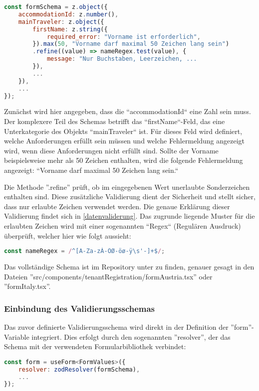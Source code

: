 \begin{lstlisting}[language=JavaScript]
const formSchema = z.object({
    accommodationId: z.number(),
    mainTraveler: z.object({
        firstName: z.string({
            required_error: "Vorname ist erforderlich",
        }).max(50, "Vorname darf maximal 50 Zeichen lang sein")
        .refine((value) => nameRegex.test(value), {
            message: "Nur Buchstaben, Leerzeichen, ...
        }),
        ...
    }),
    ...
});
\end{lstlisting}

Zunächst wird hier angegeben, dass die ``accommodationId`` eine Zahl sein muss. Der komplexere Teil des Schemas betrifft das ``firstName``-Feld, das eine Unterkategorie des Objekts ``mainTraveler`` ist. Für dieses Feld wird definiert, welche Anforderungen erfüllt sein müssen und welche Fehlermeldung angezeigt wird, wenn diese Anforderungen nicht erfüllt sind. Sollte der Vorname beispielsweise mehr als 50 Zeichen enthalten, wird die folgende Fehlermeldung angezeigt: ``Vorname darf maximal 50 Zeichen lang sein.``

Die Methode ''.refine'' prüft, ob im eingegebenen Wert unerlaubte Sonderzeichen enthalten sind. Diese zusätzliche Validierung dient der Sicherheit und stellt sicher, dass nur erlaubte Zeichen verwendet werden. Die genaue Erklärung dieser Validierung findet sich in \ref{datenvaliderung}. Das zugrunde liegende Muster für die erlaubten Zeichen wird mit einer sogenannten ``Regex`` (Regulären Ausdruck) überprüft, welcher hier wie folgt aussieht:

\begin{lstlisting}[language=JavaScript]
const nameRegex = /^[A-Za-zÀ-ÖØ-öø-ÿ\s'-]+$/;
\end{lstlisting}


Das vollständige Schema ist im Repository unter \cite{equilibriaSharingFrontend} zu finden, genauer gesagt in den Dateien ''src/components/tenantRegistration/formAustria.tsx'' oder ''formItaly.tsx''.

\subsubsection{Einbindung des Validierungsschemas}
Das zuvor definierte Validierungsschema wird direkt in der Definition der ''form''-Variable integriert. Dies erfolgt durch den sogenannten ''resolver'', der das Schema mit der verwendeten Formularbibliothek verbindet:

\begin{lstlisting}[language=JavaScript]
const form = useForm<FormValues>({
    resolver: zodResolver(formSchema),
    ...
});
\end{lstlisting}

